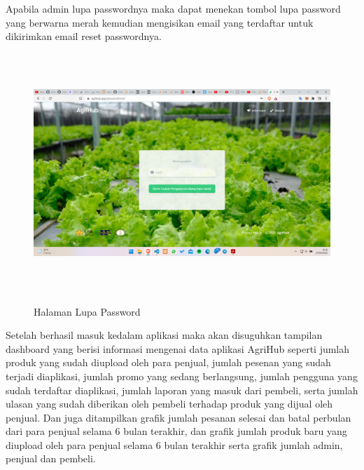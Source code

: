 \begin{enumerate}
\begin{enumerate}
			\par Apabila admin lupa passwordnya maka dapat menekan tombol lupa password yang berwarna merah kemudian mengisikan email yang terdaftar untuk dikirimkan email reset passwordnya.

			\begin{figure}[H]
				\centering
				{\includegraphics [width = 14.3cm, height= 9cm]{gambar/lupa_password}}
				\caption{Halaman Lupa Password}
				\label{lupa_password}
			\end{figure}

			\par Setelah berhasil masuk kedalam aplikasi maka akan disuguhkan tampilan dashboard yang berisi informasi mengenai data aplikasi AgriHub seperti jumlah produk yang sudah diupload oleh para penjual, jumlah pesenan yang sudah terjadi diaplikasi, jumlah promo yang sedang berlangsung, jumlah pengguna yang sudah terdaftar diaplikasi, jumlah laporan yang masuk dari pembeli, serta jumlah ulasan yang sudah diberikan oleh pembeli terhadap produk yang dijual oleh penjual. Dan juga ditampilkan grafik jumlah pesanan selesai dan batal perbulan dari para penjual selama 6 bulan terakhir, dan grafik jumlah produk baru yang diupload oleh para penjual selama 6 bulan terakhir serta grafik jumlah admin, penjual dan pembeli.


\end{enumerate}
\end{enumerate}
